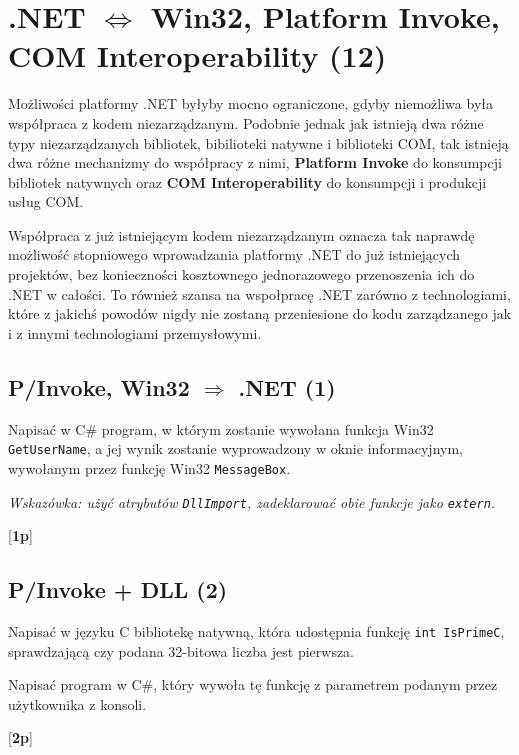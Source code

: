 ﻿\section{.NET $\Leftrightarrow$ Win32, Platform Invoke, COM Interoperability (12)}

    Możliwości platformy .NET byłyby mocno ograniczone, gdyby niemożliwa była współpraca z kodem
	  niezarządzanym. Podobnie jednak jak istnieją dwa różne typy niezarządzanych bibliotek, 
	  bibilioteki natywne i biblioteki COM, tak istnieją dwa różne mechanizmy do współpracy z nimi,
	  {\bf Platform Invoke} do konsumpcji bibliotek natywnych oraz {\bf COM Interoperability} do
	  konsumpcji i produkcji usług COM.  
	  
	  Współpraca z już istniejącym kodem niezarządzanym oznacza tak naprawdę możliwość stopniowego
	  wprowadzania platformy .NET do już istniejących projektów, bez konieczności kosztownego jednorazowego 
	  przenoszenia ich do .NET w całości. To również szansa na wspołpracę .NET zarówno z technologiami, 
	  które z jakichś powodów nigdy nie zostaną przeniesione do kodu zarządza\-ne\-go jak i z innymi 
    technologiami przemysłowymi.
	  
\subsection{P/Invoke, Win32 $\Rightarrow$ .NET (1)}

      Napisać w C\# program, w którym zostanie wywołana funkcja Win32 {\tt GetUserName}, a jej wynik zostanie
\label{pinvoke}	  
      wyprowadzony w oknie informacyjnym, wywołanym przez funkcję Win32 {\tt MessageBox}.
      
      {\em Wskazówka: użyć atrybutów {\tt DllImport}, zadeklarować obie funkcje jako {\tt extern}.}

      [{\bf 1p}]

\subsection{P/Invoke + DLL (2)}

      Napisać w języku C bibliotekę natywną, która udostępnia funkcję {\tt int IsPrimeC}, 
\label{pinvoke_dll}
      sprawdzającą czy podana 32-bitowa liczba jest pierwsza.
      
      Napisać program w C\#, który wywoła tę funkcję z parametrem podanym przez użytkownika z konsoli.

      [{\bf 2p}]

